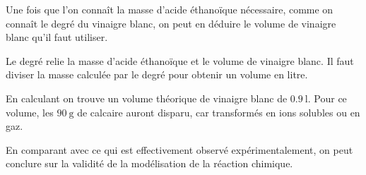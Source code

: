 %
\begin{coupDePouce}
  Une fois que l'on connaît la masse d'acide éthanoïque nécessaire, comme on connaît le degré du vinaigre blanc, on peut en déduire le volume de vinaigre blanc qu'il faut utiliser.
  
  Le degré relie la masse d'acide éthanoïque et le volume de vinaigre blanc.
  Il faut diviser la masse calculée par le degré pour obtenir un volume en litre.
\end{coupDePouce}

%
\begin{coupDePouce}
  En calculant on trouve un volume théorique de vinaigre blanc de $\qty{0,9}{\litre}$.
  Pour ce volume, les $\qty{90}{\g}$ de calcaire auront disparu, car transformés en ions solubles ou en gaz.
  
  En comparant avec ce qui est effectivement observé expérimentalement, on peut conclure sur la validité de la modélisation de la réaction chimique.
\end{coupDePouce}